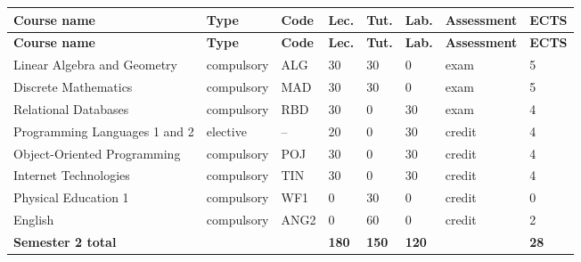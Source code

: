 \documentclass[12pt,a4paper]{article}
\newcommand{\thdrule}{\noalign{\global\setlength{\extrarowheight}{0pt}}}
\newcommand{\thdend}{\noalign{\global\setlength{\extrarowheight}{4pt}}}
\begin{document}
{\scriptsize
\begin{longtable}{m{5.0cm}m{1.9cm}m{0.75cm}m{0.85cm}m{0.85cm}m{0.85cm}m{1.45cm}m{0.9cm}}
\thdrule\toprule
\rowcolor{pjatkRed}
{\color{white}\footnotesize\textbf{\vphantom{Ag}Course name}} & {\color{white}\footnotesize\textbf{\vphantom{Ag}Type}} & {\color{white}\footnotesize\textbf{\vphantom{Ag}Code}} & {\color{white}\footnotesize\textbf{\vphantom{Ag}Lec.}} & {\color{white}\footnotesize\textbf{\vphantom{Ag}Tut.}} & {\color{white}\footnotesize\textbf{\vphantom{Ag}Lab.}} & {\color{white}\footnotesize\textbf{\vphantom{Ag}Assessment}} & {\color{white}\footnotesize\textbf{\vphantom{Ag}ECTS}} \\
\midrule\thdend
\endfirsthead
\thdrule\toprule
\rowcolor{pjatkRed}
{\color{white}\footnotesize\textbf{\vphantom{Ag}Course name}} & {\color{white}\footnotesize\textbf{\vphantom{Ag}Type}} & {\color{white}\footnotesize\textbf{\vphantom{Ag}Code}} & {\color{white}\footnotesize\textbf{\vphantom{Ag}Lec.}} & {\color{white}\footnotesize\textbf{\vphantom{Ag}Tut.}} & {\color{white}\footnotesize\textbf{\vphantom{Ag}Lab.}} & {\color{white}\footnotesize\textbf{\vphantom{Ag}Assessment}} & {\color{white}\footnotesize\textbf{\vphantom{Ag}ECTS}} \\
\midrule\thdend
\endhead
\rowcolor{tableRowLight} Linear Algebra and Geometry & {\scriptsize compulsory} & ALG & 30 & 30 & 0 & {\scriptsize exam} & 5 \\
\rowcolor{tableRowAlt} Discrete Mathematics & {\scriptsize compulsory} & MAD & 30 & 30 & 0 & {\scriptsize exam} & 5 \\
\rowcolor{tableRowLight} Relational Databases & {\scriptsize compulsory} & RBD & 30 & 0 & 30 & {\scriptsize exam} & 4 \\
\rowcolor{tableElective} Programming Languages 1 and 2 & {\scriptsize elective} & -- & 20 & 0 & 30 & {\scriptsize credit} & 4 \\
\rowcolor{tableRowAlt} Object-Oriented Programming & {\scriptsize compulsory} & POJ & 30 & 0 & 30 & {\scriptsize credit} & 4 \\
\rowcolor{tableRowLight} Internet Technologies & {\scriptsize compulsory} & TIN & 30 & 0 & 30 & {\scriptsize credit} & 4 \\
\rowcolor{tableRowAlt} Physical Education 1 & {\scriptsize compulsory} & WF1 & 0 & 30 & 0 & {\scriptsize credit} & 0 \\
\rowcolor{tableRowLight} English & {\scriptsize compulsory} & ANG2 & 0 & 60 & 0 & {\scriptsize credit} & 2 \\
\midrule[\heavyrulewidth]
\rowcolor{tableSummary} \textbf{Semester 2 total} & & & \textbf{180} & \textbf{150} & \textbf{120} & & \textbf{28} \\
\bottomrule
\end{longtable}}
\end{document}

